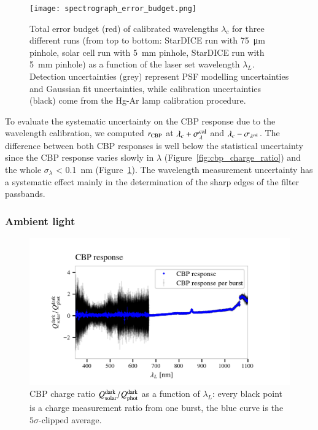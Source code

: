 \begin{figure}[!h]
\centering
\texttt{[image: spectrograph\_error\_budget.png]}
\caption{Total error budget (red) of calibrated wavelengths $\lambda_c$ for three different runs (from top to bottom: StarDICE run with \SI{75}{\um} pinhole, solar cell run with \SI{5}{mm} pinhole, StarDICE run with \SI{5}{mm} pinhole) as a function of the laser set wavelength $\lambda_L$. Detection uncertainties (grey) represent PSF modelling uncertainties and Gaussian fit uncertainties, while calibration uncertainties (black) come from the Hg-Ar lamp calibration procedure. }\label{fig:wavelength_error_budget}
\end{figure}

To evaluate the systematic uncertainty on the CBP response due to the wavelength calibration, we computed $r_{\rm CBP}$ at $\lambda_c+\sigma_{\lambda}^{\rm cal}$ and $\lambda_c-\sigma_{\lambda^{\rm cal}}$. The difference between both CBP responses is well below the statistical uncertainty since the CBP response varies slowly in $\lambda$ (Figure~\ref{fig:cbp_charge_ratio}) and the whole $\sigma_\lambda$ < \SI{0.1}{\nano\meter} (Figure~\ref{fig:wavelength_error_budget}). The wavelength measurement uncertainty has a systematic effect mainly in the determination of the sharp edges of the filter passbands.



\subsubsection{Ambient light}\label{sec:sc_linearity}

\begin{figure}[h]
    \centering
    \includegraphics[width=\columnwidth]{fig/sc_dark_qswMAX.png}
    \caption{CBP charge ratio $Q_{\mathrm{solar}}^{\rm dark}/Q_{\mathrm{phot}}^{\rm dark}$ as a function of $\lambda_L$: every black point is a charge measurement ratio from one burst, the blue curve is the $5\sigma$-clipped average.}
    \label{fig:sc_dark}
\end{figure}

